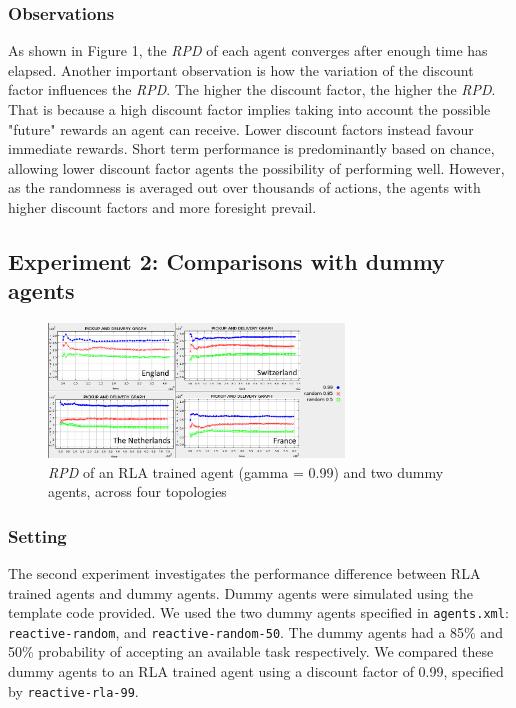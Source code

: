 \documentclass[11pt]{article}
\begin{document}
\subsubsection{Observations}
As shown in Figure 1, the \textit{RPD} of each agent converges after enough time has elapsed. Another important observation is how the variation of the discount factor influences the \textit{RPD}. The higher the discount factor, the higher the \textit{RPD}. That is because a high discount factor implies taking into account the possible "future" rewards an agent can receive. Lower discount factors instead favour immediate rewards. Short term performance is predominantly based on chance, allowing lower discount factor agents the possibility of performing well. However, as the randomness is averaged out over thousands of actions, the agents with higher discount factors and more foresight prevail.

\subsection{Experiment 2: Comparisons with dummy agents}
\begin{figure}
	\centering
	\includegraphics[width=0.7\textwidth]{ex2}
	\caption{\textit{RPD} of an RLA trained agent (gamma = 0.99) and two dummy agents, across four topologies}
	\label{figure:1}
\end{figure}
\subsubsection{Setting}
The second experiment investigates the performance difference between RLA trained agents and dummy agents. Dummy agents were simulated using the template code provided. We used the two dummy agents specified in \texttt{agents.xml}: \texttt{reactive-random}, and \texttt{reactive-random-50}. The dummy agents had a 85\% and 50\% probability of accepting an available task respectively. We compared these dummy agents to an RLA trained agent using a discount factor of 0.99, specified by \texttt{reactive-rla-99}.\\
\\
\\
\end{document}
